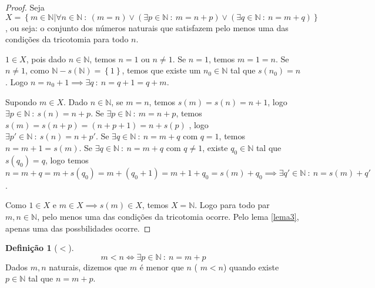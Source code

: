 \documentclass{article}
\theoremstyle{plain}
\theoremstyle{definition}
\newtheorem{definicao}{Definição}[section]
\theoremstyle{remark}
\begin{document}
\begin{proof}
	Seja $X = \left\{m \in \mathbb{N} | \forall n \in \mathbb{N} \: : \: (m = n ) \lor (	\exists p \in \mathbb{N} \: : \: m = n+p ) \lor ( 	\exists q \in \mathbb{N} \: : \: n = m+q ) \right\}$, ou seja: o conjunto dos números naturais que satisfazem pelo menos uma das condições da tricotomia para todo $n$.  

	$1\in X$, pois dado $n\in \mathbb{N}$, temos $n = 1$ ou $n\neq 1$. Se $n=1$, temos $m =1 = n$. Se $n\neq 1$, como $\mathbb{N} - s(\mathbb{N}) = \left\{1\right\}$, temos que existe um $n_0\in \mathbb{N}$ tal que $s(n_0) = n$. Logo $n = n_0 +1 \implies \exists q \: : \: n = q+1  = q+m $.
	
	Supondo $m\in X$. Dado $n\in \mathbb{N}$, se $m = n$, temos $s(m) = s(n) = n+1$, logo $\exists p \in\mathbb{N} \: : \: s(n) = n+p$. Se  $\exists p \in\mathbb{N} \: : \: m = n+p$, temos $s(m) = s(n+p) = (n+p+1) = n +s(p)$ , logo $\exists p' \in\mathbb{N} \: : \: s(n) = n+p'$. Se $\exists q \in \mathbb{N} \: : \: n = m+q $ com $q=1$, temos $n = m+1 = s(m)$. Se $\exists q \in \mathbb{N} \: : \: n = m+q $ com $q\neq 1$, existe $q_0\in \mathbb{N}$ tal que $s(q_0) = q$, logo temos $n = m+q = m +s(q_0) = m+(q_0+1) = m+1+q_0 = s(m)+q_0 \implies \exists q' \in \mathbb{N} \: : \: n = s(m)+q' $. 

	Como $1\in X$ e $m\in X \implies s(m) \in X$, temos $X = \mathbb{N}$.  Logo para todo par $m,n\in \mathbb{N}$, pelo menos uma das condições da tricotomia ocorre. Pelo lema \ref{lema3}, apenas uma das possbilidades ocorre. 
\end{proof}
\begin{definicao}[$<$]
	$$ m<n \iff \exists p\in \mathbb{N} \: : \: n = m+p$$
	Dados $m,n$ naturais, dizemos que $m$ é menor que $n$ ( $m<n$) quando existe $p\in \mathbb{N}$ tal que $n = m+p$.
\end{definicao}
\end{document}
